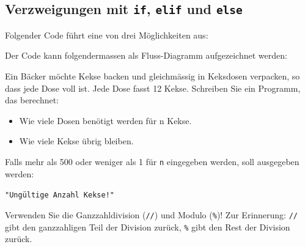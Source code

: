 \subsection{Verzweigungen mit \texorpdfstring{\lstinline|if|}{if}, \texorpdfstring{\lstinline|elif|}{elif} und \texorpdfstring{\lstinline|else|}{else}}
\begin{myexample}
Folgender Code führt eine von drei Möglichkeiten aus:


Der Code kann folgendermassen als Fluss-Diagramm aufgezeichnet werden:

\begin{figure}[H]
	\centering
	
\end{figure}
\end{myexample}

\begin{myexercise}
	Ein Bäcker möchte Kekse backen und gleichmässig in Keksdosen verpacken, so dass jede Dose voll ist. Jede Dose fasst 12 Kekse. Schreiben Sie ein Programm, das berechnet:

	\begin{itemize}
		\item Wie viele Dosen benötigt werden für n Kekse.
		\item Wie viele Kekse übrig bleiben.
	\end{itemize}

	Falls mehr als 500 oder weniger als 1 für \texttt{n} eingegeben werden, soll ausgegeben werden:

	\lstinline|"Ungültige Anzahl Kekse!"|

	Verwenden Sie die Ganzzahldivision (\lstinline|//|) und Modulo (\lstinline|%|)! Zur Erinnerung: \lstinline|//| gibt den ganzzahligen Teil der Division zurück, \lstinline|%| gibt den Rest der Division zurück.

	\begin{myanswer}
		
	\end{myanswer}
\end{myexercise}


